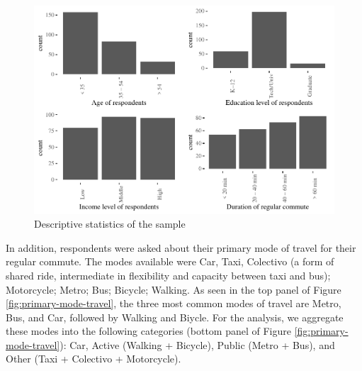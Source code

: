 \documentclass[]{elsarticle} %
\makeatletter
\def\maxwidth{\ifdim\Gin@nat@width>\linewidth\linewidth
\else\Gin@nat@width\fi}
\let\Oldincludegraphics\includegraphics
\renewcommand{\includegraphics}[1]{\Oldincludegraphics[width=\maxwidth]{#1}}
\makeatother
\begin{document}
\begin{figure}
\centering
\includegraphics{Dissonance_Santiago_v1_files/figure-latex/plot-descriptive-statistics-1.pdf}
\caption{\label{fig:descriptive-statistics}Descriptive statistics of the
sample}
\end{figure}

In addition, respondents were asked about their primary mode of travel
for their regular commute. The modes available were Car, Taxi, Colectivo
(a form of shared ride, intermediate in flexibility and capacity between
taxi and bus); Motorcycle; Metro; Bus; Bicycle; Walking. As seen in the
top panel of Figure \ref{fig:primary-mode-travel}, the three most common
modes of travel are Metro, Bus, and Car, followed by Walking and Biycle.
For the analysis, we aggregate these modes into the following categories
(bottom panel of Figure \ref{fig:primary-mode-travel}): Car, Active
(Walking + Bicycle), Public (Metro + Bus), and Other (Taxi + Colectivo +
Motorcycle).
\end{document}

